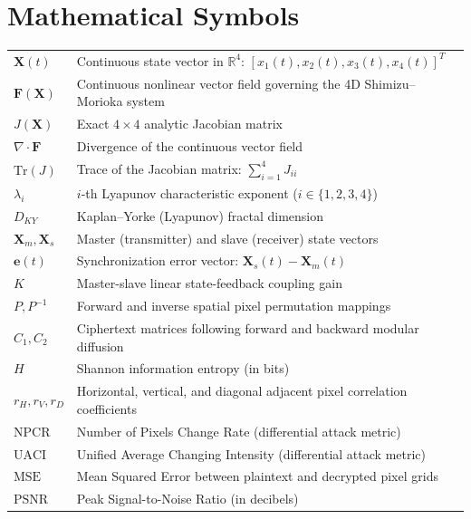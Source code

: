 \documentclass[12pt,a4paper,oneside]{report}
\begin{document}
\section*{Mathematical Symbols}
\noindent\begin{tabular}{@{}p{3.2cm}p{11.5cm}@{}}
$\mathbf{X}(t)$ & Continuous state vector in $\mathbb{R}^4$: $[x_1(t), x_2(t), x_3(t), x_4(t)]^T$ \\
$\mathbf{F}(\mathbf{X})$ & Continuous nonlinear vector field governing the 4D Shimizu--Morioka system \\
$J(\mathbf{X})$ & Exact $4 \times 4$ analytic Jacobian matrix \\
$\nabla \cdot \mathbf{F}$ & Divergence of the continuous vector field \\
$\text{Tr}(J)$ & Trace of the Jacobian matrix: $\sum_{i=1}^4 J_{ii}$ \\
$\lambda_i$ & $i$-th Lyapunov characteristic exponent ($i \in \{1, 2, 3, 4\}$) \\
$D_{KY}$ & Kaplan--Yorke (Lyapunov) fractal dimension \\
$\mathbf{X}_m, \mathbf{X}_s$ & Master (transmitter) and slave (receiver) state vectors \\
$\mathbf{e}(t)$ & Synchronization error vector: $\mathbf{X}_s(t) - \mathbf{X}_m(t)$ \\
$K$ & Master-slave linear state-feedback coupling gain \\
$P, P^{-1}$ & Forward and inverse spatial pixel permutation mappings \\
$C_1, C_2$ & Ciphertext matrices following forward and backward modular diffusion \\
$H$ & Shannon information entropy (in bits) \\
$r_H, r_V, r_D$ & Horizontal, vertical, and diagonal adjacent pixel correlation coefficients \\
$\text{NPCR}$ & Number of Pixels Change Rate (differential attack metric) \\
$\text{UACI}$ & Unified Average Changing Intensity (differential attack metric) \\
$\text{MSE}$ & Mean Squared Error between plaintext and decrypted pixel grids \\
$\text{PSNR}$ & Peak Signal-to-Noise Ratio (in decibels)
\end{tabular}

\vspace{0.8cm}
\end{document}
